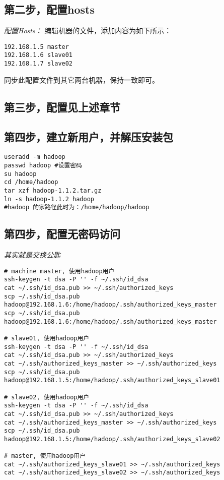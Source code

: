 \documentclass{article}
\begin{document}
\subsection{第二步，配置hosts}
\textit{配置Hosts：}
编辑机器的文件，添加内容为如下所示：

\begin{verbatim}
192.168.1.5 master
192.168.1.6 slave01
192.168.1.7 slave02
\end{verbatim}

同步此配置文件到其它两台机器，保持一致即可。

\subsection{第三步，配置见上述章节}

\subsection{第四步，建立新用户，并解压安装包}
\begin{verbatim}
useradd -m hadoop
passwd hadoop #设置密码
su hadoop
cd /home/hadoop
tar xzf hadoop-1.1.2.tar.gz 
ln -s hadoop-1.1.2 hadoop
#hadoop 的家路径此时为：/home/hadoop/hadoop
\end{verbatim}

\subsection{第四步，配置无密码访问}
\textit{其实就是交换公匙}
\begin{verbatim}
# machine master, 使用hadoop用户
ssh-keygen -t dsa -P '' -f ~/.ssh/id_dsa
cat ~/.ssh/id_dsa.pub >> ~/.ssh/authorized_keys
scp ~/.ssh/id_dsa.pub hadoop@192.168.1.6:/home/hadoop/.ssh/authorized_keys_master
scp ~/.ssh/id_dsa.pub hadoop@192.168.1.6:/home/hadoop/.ssh/authorized_keys_master

# slave01, 使用hadoop用户
ssh-keygen -t dsa -P '' -f ~/.ssh/id_dsa
cat ~/.ssh/id_dsa.pub >> ~/.ssh/authorized_keys
cat ~/.ssh/authorized_keys_master >> ~/.ssh/authorized_keys
scp ~/.ssh/id_dsa.pub hadoop@192.168.1.5:/home/hadoop/.ssh/authorized_keys_slave01

# slave02, 使用hadoop用户
ssh-keygen -t dsa -P '' -f ~/.ssh/id_dsa
cat ~/.ssh/id_dsa.pub >> ~/.ssh/authorized_keys
cat ~/.ssh/authorized_keys_master >> ~/.ssh/authorized_keys
scp ~/.ssh/id_dsa.pub hadoop@192.168.1.5:/home/hadoop/.ssh/authorized_keys_slave02

# master, 使用hadoop用户
cat ~/.ssh/authorized_keys_slave01 >> ~/.ssh/authorized_keys
cat ~/.ssh/authorized_keys_slave02 >> ~/.ssh/authorized_keys
\end{verbatim}
\end{document}

